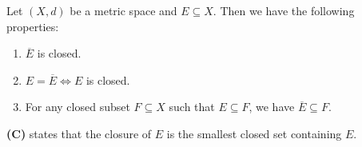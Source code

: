 \bigskip

\begin{theorem} \label{thm:PropertiesOfClosure}
    Let $(X, d)$ be a metric space and $E \subseteq X$. Then we have the following properties:
    \begin{enumerate}[label=\textbf{(\Alph*)}]
        \item $\overline{E}$ is closed.
        \item $E = \overline{E} \iff E$ is closed.
        \item For any closed subset $F \subseteq X$ such that $E \subseteq F$, we have $\overline{E} \subseteq F$.
    \end{enumerate}
    \textbf{(C)} states that the closure of $E$ is the smallest closed set containing $E$.
\end{theorem}

